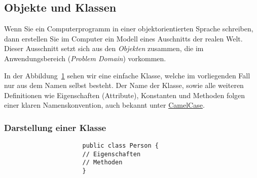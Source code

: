 \subsection{Objekte und Klassen}
\label{subsec:objects-classes}

Wenn Sie ein Computerprogramm in einer objektorientierten Sprache schreiben,
dann erstellen Sie im Computer ein Modell eines Auschnitts der realen Welt.
Dieser Ausschnitt setzt sich aus den \emph{Objekten} zusammen, die im
Anwendungsbereich (\emph{Problem Domain}) vorkommen.


In der Abbildung~\ref{fig:uml-class} sehen wir eine einfache Klasse,
welche im vorliegenden Fall nur aus dem Namen selbst besteht. Der Name der Klasse,
sowie alle weiteren Definitionen wie Eigenschaften (Attribute), Konstanten und Methoden
folgen einer klaren Namenskonvention, auch bekannt unter
\href{https://www.geeksforgeeks.org/java-naming-conventions/}{CamelCase}.

\begin{frame}[fragile]
    \frametitle<presentation>{Darstellung einer Klasse}

    \begin{figure}[ht]
        \centering
        \begin{minipage}[b]{0.5\textwidth}
            \centering
        \end{minipage}
        \begin{minipage}[b]{0.4\textwidth}
            \begin{verbatim}
                public class Person {
                // Eigenschaften
                // Methoden
                }
            \end{verbatim}
        \end{minipage}
        \label{fig:uml-class}
    \end{figure}

\end{frame}



